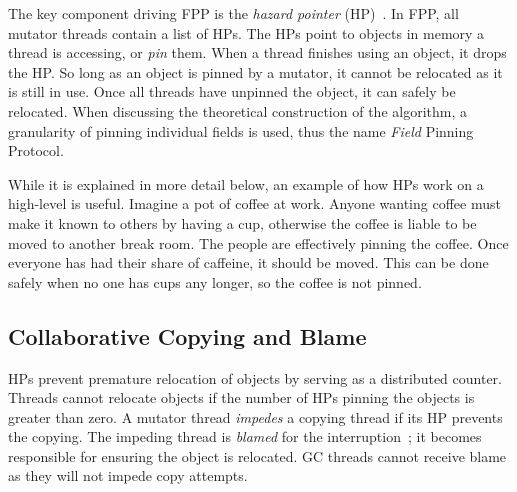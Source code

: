 \documentclass{sig-alternate}
\begin{document}
The key component driving FPP is the \emph{hazard pointer} (HP)~\cite{Osterlund:FPP}. 
In FPP, all mutator threads contain a list of HPs.
The HPs point to objects in memory a thread is accessing, or \emph{pin} them.
When a thread finishes using an object, it drops the HP.
So long as an object
is pinned by a mutator, it cannot be relocated as it is still in use. Once all threads have
unpinned the object, it can safely be relocated.
When discussing the theoretical construction of the algorithm, a granularity of pinning 
individual fields is used, thus the name \emph{Field} Pinning Protocol. 

While it is explained in more detail below, an example of how HPs 
work on a high-level is useful. Imagine a pot of coffee at work. Anyone 
wanting coffee must make it known to others by having a cup, otherwise the 
coffee is liable to be moved to another break room. The people are effectively pinning the coffee.
Once everyone has had their share of caffeine, it should be moved. This can
be done safely when no one has cups any longer, so the coffee is not pinned.



\subsection{Collaborative Copying and Blame}
\label{sec:fppCopy}

HPs prevent premature relocation of objects by serving as a distributed
counter. Threads cannot relocate objects if the number of
HPs pinning the objects is greater than zero.
A mutator thread \emph{impedes} a copying thread if
its HP prevents the copying.
The impeding thread is \emph{blamed} for the 
interruption~\cite{Osterlund:FPP}; it becomes responsible for ensuring 
the object is relocated. GC threads cannot receive blame as they will not impede
copy attempts.
\end{document}
